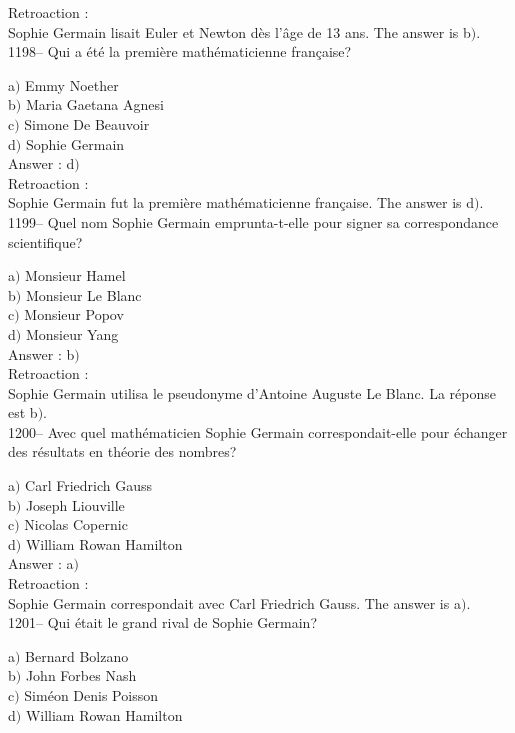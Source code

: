 ﻿\documentclass[letterpaper, 12pt]{article}
\begin{document}
Retroaction : \\
Sophie Germain lisait Euler et Newton d\`es l'\^age de 13 ans.
The answer is b$)$.\\

1198-- Qui a \'et\'e la premi\`ere math\'ematicienne fran\c caise?

a$)$ Emmy Noether \\
b$)$ Maria Gaetana Agnesi \\
c$)$ Simone De Beauvoir \\
d$)$ Sophie Germain\\

Answer : d$)$\\

Retroaction : \\
Sophie Germain fut la premi\`ere math\'ematicienne fran\c caise.
The answer is d$)$.\\

1199-- Quel nom Sophie Germain emprunta-t-elle pour signer sa
correspondance scientifique?

a$)$ Monsieur Hamel \\
b$)$ Monsieur Le Blanc \\
c$)$ Monsieur Popov \\
d$)$ Monsieur Yang\\

Answer : b$)$\\

Retroaction : \\
Sophie Germain utilisa le pseudonyme d'Antoine Auguste Le Blanc.  La
r\'eponse est b$)$.\\

1200-- Avec quel math\'ematicien Sophie Germain correspondait-elle
pour \'echanger des r\'esultats en th\'eorie des nombres?

a$)$ Carl Friedrich Gauss \\
b$)$ Joseph Liouville \\
c$)$ Nicolas Copernic \\
d$)$ William Rowan Hamilton\\

Answer : a$)$\\

Retroaction : \\
Sophie Germain correspondait avec Carl Friedrich Gauss.
The answer is a$)$.\\

1201-- Qui \'etait le grand rival de Sophie Germain?

a$)$ Bernard Bolzano \\
b$)$ John Forbes Nash \\
c$)$ Sim\'eon Denis Poisson \\
d$)$ William Rowan Hamilton\\
\end{document}
